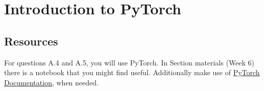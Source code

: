 \documentclass{article}
\begin{document}
    

\section*{Introduction to PyTorch}
  \subsection*{Resources}
        For questions A.4 and A.5, you will use PyTorch.
        In Section materials (Week 6) there is a notebook that you might find useful.
        Additionally make use of \href{https://pytorch.org/docs/stable/index.html}{PyTorch Documentation}, when needed.
        
\end{document}
